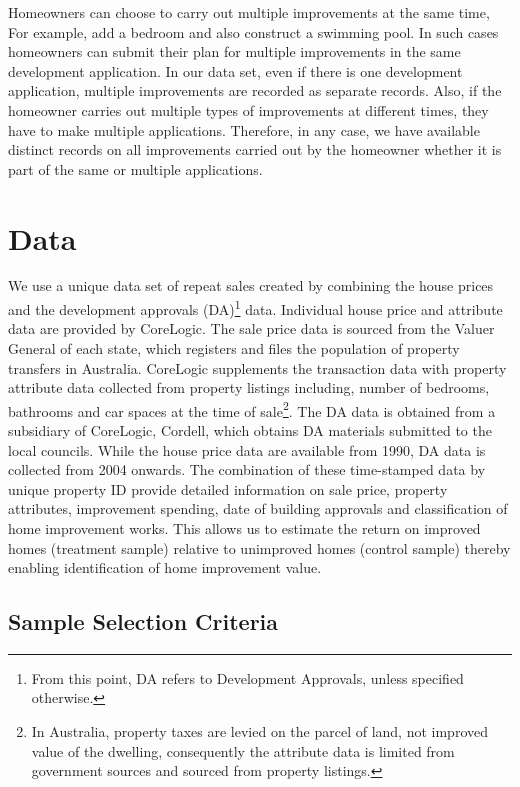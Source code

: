 \documentclass[AEJ,reqno, draftmode]{AEA} %
\begin{document}
Homeowners can choose to carry out multiple improvements at the same time, For example, add a bedroom and also construct a swimming pool. In such cases homeowners can submit their plan for multiple improvements in the same development application. In our data set, even if there is one development application, multiple improvements are recorded as separate records. Also, if the homeowner carries out multiple types of improvements at different times, they have to make multiple applications. Therefore, in any case, we have available distinct records on all improvements carried out by the homeowner whether it is part of the same or multiple applications.


\section{Data}

We use a unique data set of repeat sales created by combining the house prices and the development approvals (DA)\footnote{From this point, DA refers to Development Approvals, unless specified otherwise.} data. Individual house price and attribute data are provided by CoreLogic. The sale price data is sourced from the Valuer General of each state, which registers and files the population of property transfers in Australia. CoreLogic supplements the transaction data with property attribute data collected from property listings including, number of bedrooms, bathrooms and car spaces at the time of sale\footnote{In Australia, property taxes are levied on the parcel of land, not improved value of the dwelling, consequently the attribute data is limited from government sources and sourced from property listings.}. The DA data is obtained from a subsidiary of CoreLogic, Cordell, which obtains DA materials submitted to the local councils. While the house price data are available from 1990, DA data is collected from 2004 onwards. The combination of these time-stamped data by unique property ID provide detailed information on sale price, property attributes, improvement spending, date of building approvals and classification of home improvement works. This allows us to estimate the return on improved homes (treatment sample) relative to unimproved homes (control sample) thereby enabling identification of home improvement value.


\subsection{Sample Selection Criteria}
\end{document}
